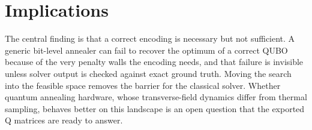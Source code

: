 \section{Implications}

The central finding is that a correct encoding is necessary but not
sufficient. A generic bit-level annealer can fail to recover the optimum of a
correct QUBO because of the very penalty walls the encoding needs, and that
failure is invisible unless solver output is checked against exact ground
truth. Moving the search into the feasible space removes the barrier for the
classical solver. Whether quantum annealing hardware, whose transverse-field
dynamics differ from thermal sampling, behaves better on this landscape is an
open question that the exported Q matrices are ready to answer.
